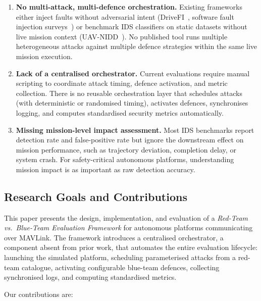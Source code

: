 \begin{enumerate}
    \item \textbf{No multi-attack, multi-defence orchestration.}
    Existing frameworks either inject faults without adversarial intent (DriveFI~\cite{jha2019drivefi}, software fault injection surveys~\cite{natella2016faultinjection}) or benchmark IDS classifiers on static datasets without live mission context (UAV-NIDD~\cite{hadi2025uavnidd}).
    No published tool runs multiple heterogeneous attacks against multiple defence strategies within the same live mission execution.

    \item \textbf{Lack of a centralised orchestrator.}
    Current evaluations require manual scripting to coordinate attack timing, defence activation, and metric collection.
    There is no reusable orchestration layer that schedules attacks (with deterministic or randomised timing), activates defences, synchronises logging, and computes standardised security metrics automatically.

    \item \textbf{Missing mission-level impact assessment.}
    Most IDS benchmarks report detection rate and false-positive rate but ignore the downstream effect on mission performance, such as trajectory deviation, completion delay, or system crash.
    For safety-critical autonomous platforms, understanding mission impact is as important as raw detection accuracy.
\end{enumerate}

\subsection{Research Goals and Contributions}

This paper presents the design, implementation, and evaluation of a \emph{Red-Team vs.\ Blue-Team Evaluation Framework} for autonomous platforms communicating over MAVLink.
The framework introduces a centralised orchestrator, a component absent from prior work, that automates the entire evaluation lifecycle: launching the simulated platform, scheduling parameterised attacks from a red-team catalogue, activating configurable blue-team defences, collecting synchronised logs, and computing standardised metrics.

Our contributions are:

